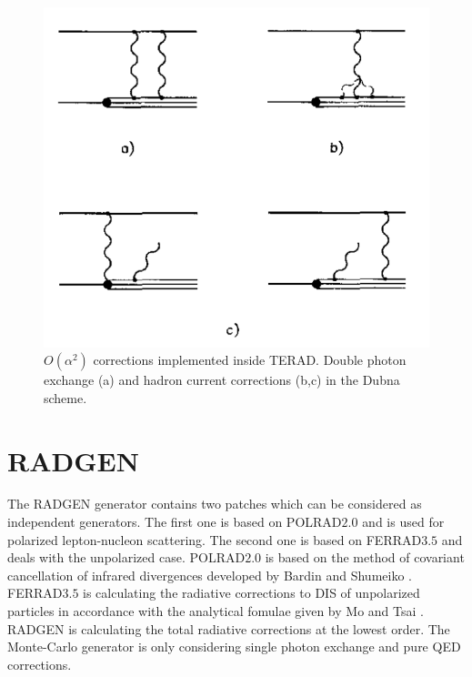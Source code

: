 \begin{figure}[!h]
  \centering
	\includegraphics[scale=0.8]{./gfx/order2corr.png}
	\caption{$O(\alpha^2)$ corrections implemented inside TERAD. Double photon exchange (a) and hadron current corrections (b,c) in the Dubna scheme.}
	\label{pic:order2corr}
\end{figure}


\section{RADGEN}

The RADGEN generator \cite{RADGEN} contains two patches which can be considered as independent generators. The first one is based on POLRAD$2.0$ \cite{POLRAD} and is used for polarized lepton-nucleon scattering. The second one is based on FERRAD$3.5$ \cite{FERRAD} and deals with the unpolarized case.
POLRAD$2.0$ is based on the method of covariant cancellation of infrared divergences developed by Bardin and Shumeiko \cite{BardinShu}. FERRAD$3.5$ is calculating the radiative corrections to DIS of unpolarized particles in accordance with the analytical fomulae given by Mo and Tsai \cite{MoTsai}. RADGEN is calculating the total radiative corrections at the lowest order. The Monte-Carlo generator is only considering single photon exchange and pure QED corrections.

